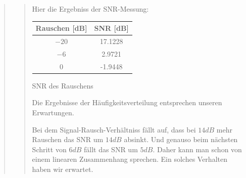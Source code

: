 \begin{quote}
\begin{quote}
        
        Hier die Ergebniss der SNR-Messung:
            \begin{center}
                  \begin{tabular}{|c|c|}
                  \hline
                   Rauschen [dB] &  SNR [dB] \\ \hline 
                   $-20$ &  17.1228 \\ \hline
                   $-6$ &  2.9721 \\ \hline
                   $0$ &  -1.9448 \\ \hline           
                 \end{tabular}\vspace{1em}
                 
            \caption{SNR des Rauschens}            
            \end{center}
    
        Die Ergebnisse der Häufigkeitsverteilung entsprechen unseren Erwartungen. 
    
        Bei dem Signal-Rausch-Verhältniss fällt auf, dass bei $14dB$ mehr Rauschen das SNR um $14dB$ absinkt. Und
        genauso beim nächsten Schritt von $6dB$ fällt das SNR um $5dB$. Daher kann man schon von einem linearen
        Zusammenhang sprechen. Ein solches Verhalten haben wir erwartet. 
        
    \end{quote}
\end{quote}


